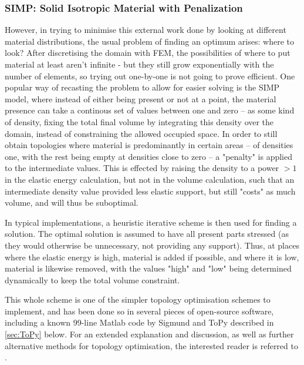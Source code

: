 \subsubsection{SIMP: Solid Isotropic Material with Penalization}
However, in trying to minimise this external work done by looking at different material distributions, the usual problem of finding an optimum arises: where to look? After discretising the domain with FEM, the possibilities of where to put material at least aren't infinite - but they still grow exponentially with the number of elements, so trying out one-by-one is not going to prove efficient. One popular way of recasting the problem to allow for easier solving is the SIMP model, where instead of either being present or not at a point, the material presence can take a continous set of values between one and zero -- as some kind of density, fixing the total final volume by integrating this density over the domain, instead of constraining the allowed occupied space. In order to still obtain topologies where material is predominantly in certain areas -- of densities one, with the rest being empty at densities close to zero -- a "penalty" is applied to the intermediate values. This is effected by raising the density to a power $> 1$ in the elastic energy calculation, but not in the volume calculation, such that an intermediate density value provided less elastic support, but still "costs" as much volume, and will thus be suboptimal. 

In typical implementations, a heuristic iterative scheme is then used for finding a solution. The optimal solution is assumed to have all present parts stressed (as they would otherwise be unnecessary, not providing any support). Thus, at places where the elastic energy is high, material is added if possible, and where it is low, material is likewise removed, with the values "high" and "low" being determined dynamically to keep the total volume constraint. 

This whole scheme is one of the simpler topology optimisation schemes to implement, and has been done so in several pieces of open-source software, including a known 99-line Matlab code by Sigmund \cite{sigmund200199}and ToPy described in \autoref{sec:ToPy} below. For an extended explanation and discussion, as well as further alternative methods for topology optimisation, the interested reader is referred to \cite{bendsoe2003topology}.



